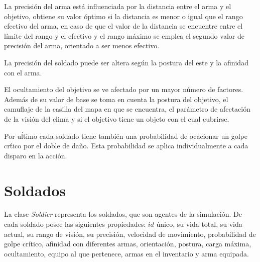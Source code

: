 \documentclass[twoside]{article}
\begin{document}
La precisi\'on del arma est\'a influenciada por la distancia entre el arma y el objetivo, obtiene su valor \'optimo si la distancia es menor o igual que el rango efectivo del arma, en caso de que el valor de la distancia se encuentre entre el l\'imite del rango y el efectivo y el rango m\'aximo se emplea el segundo valor de precisi\'on del arma, orientado a ser menos efectivo.

La precisi\'on del soldado puede ser altera seg\'un la postura del este y la afinidad con el arma.

El ocultamiento del objetivo se ve afectado por un mayor n\'umero de factores. Adem\'as de su valor de base se toma en cuenta la postura del objetivo, el camuflaje de la casilla del mapa en que se encuentra, el par\'ametro de afectaci\'on de la visi\'on del clima y si el objetivo tiene un objeto con el cual cubrirse.

Por u\'ltimo cada soldado tiene tambi\'en una probabilidad de ocacionar un golpe cr\'tico por el doble de da\~no. Esta probabilidad se aplica individualmente a cada disparo en la acci\'on.

\section{Soldados}

La clase \emph{Soldier} representa los soldados, que son agentes de la simulaci\'on. De cada soldado posee las siguientes propiedades: $id$ \'unico, su vida total, su vida actual, su rango de visi\'on, su precisi\'on, velocidad de movimiento, probabilidad de golpe cr\'itico, afinidad con diferentes armas, orientaci\'on, postura, carga m\'axima, ocultamiento, equipo al que pertenece, armas en el inventario y arma equipada.
\end{document}
